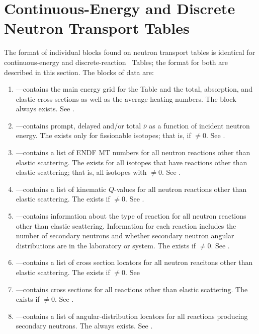\section{Continuous-Energy and Discrete Neutron Transport Tables}\label{sec:ContinuousEnergyNeutron}
The format of individual blocks found on neutron transport tables is identical for continuous-energy and discrete-reaction \ACE\ Tables; the format for both are described in this section. The blocks of data are:
\begin{enumerate}
  \item \textbf{}---contains the main energy grid for the Table and the total, absorption, and elastic cross sections as well as the average heating numbers. The  block always exists. See .
  \item \textbf{}---contains prompt, delayed and/or total $\overline{\nu}$ as a function of incident neutron energy. The  exists only for fissionable isotopes; that is, if $\neq0$. See .
  \item \textbf{}---contains a list of ENDF MT numbers for all neutron reactions other than elastic scattering. The  exists for all isotopes that have reactions other than elastic scattering; that is, all isotopes with $\neq0$. See .
  \item \textbf{}---contains a list of kinematic $Q$-values for all neutron reactions other than elastic scattering. The  exists if $\neq0$. See .
  \item \textbf{}---contains information about the type of reaction for all neutron reactions other than elastic scattering. Information for each reaction includes the number of secondary neutrons and whether secondary neutron angular distributions are in the laboratory or \CM system. The  exists if $\neq0$. See .
  \item \textbf{}---contains a list of cross section locators for all neutron reacitons other than elastic scattering. The  exists if $\neq0$. See 
  \item \textbf{}---contains cross sections for all reactions other than elastic scattering. The  exists if $\neq0$. See .
  \item \textbf{}---contains a list of angular-distribution locators for all reactions producing secondary neutrons. The  always exists. See .

\end{enumerate}
